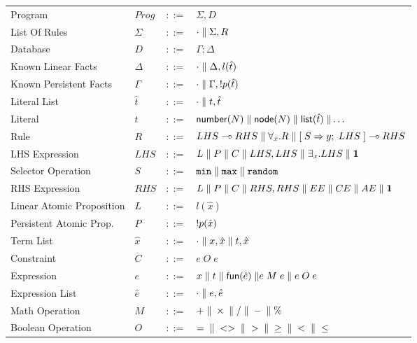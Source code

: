 \begin{table}[h]
\centering
\begin{tabular}{ l l c l }
  Program & $Prog$ & $::=$ & $\Sigma, D$ \\
  List Of Rules & $\Sigma$ & $::=$ & $\cdot \; \Vert \; \Sigma, R$\\
  Database & $D$ & $::=$ & $\Gamma; \Delta$ \\
  Known Linear Facts & $\Delta$ & $::=$ & $\cdot \; \Vert \; \Delta, l(\hat{t})$ \\
  Known Persistent Facts & $\Gamma$ & $::=$ & $\cdot \; \Vert \; \Gamma, {!} p(\hat{t})$ \\

  Literal List & $\hat{t}$ & $::=$ & $\cdot \; \Vert \; t, \hat{t}$ \\
  Literal & $t$ & $::=$ & $\mathsf{number}(N) \; \Vert \; \mathsf{node}(N) \; \Vert \; \mathsf{list}(\hat{t}) \; \Vert \ldots$ \\
  Rule & $R$ & $::=$ & $LHS \multimap RHS \; \Vert \; \forall_{x}. R \; \Vert \;
  [\; S \Rightarrow y; \; LHS \;] \multimap RHS$ \\
  LHS Expression & $LHS$ & $::=$ & $L \; \Vert \; P \; \Vert \; C \; \Vert \; LHS,
  LHS \; \Vert \; \exists_{x}. LHS \; \Vert \; \mathbf{1}$\\
  Selector Operation & $S$ & $::=$ & $\mathtt{min} \; \Vert \; \mathtt{max} \; \Vert \; \mathtt{random}$\\
  RHS Expression & $RHS$ & $::=$ & $L \; \Vert \; P \; \Vert \; C \; \Vert \; RHS, RHS \; \Vert
  \; EE \; \Vert \; CE \; \Vert \; AE \; \Vert \; \mathbf{1}$\\
  
  Linear Atomic Proposition & $L$ & $::=$ & $l(\hat{x})$\\
  Persistent Atomic Prop. & $P$ & $::=$ & ${!} p(\hat{x})$\\
  Term List & $\hat{x}$ & $::=$ & $\cdot \; \Vert \; x, \hat{x} \; \Vert \; t, \hat{x}$ \\
  Constraint & $C$ & $::=$ & $e \; O \; e$ \\
  Expression & $e$ & $::=$ & $x \; \Vert \; t \; \Vert \; \mathsf{fun}(\hat{e}) \; \Vert
  e \; M \; e \; \Vert \; e \; O \; e$ \\
  Expression List & $\hat{e}$ & $::=$ & $\cdot \; \Vert \; e, \hat{e}$ \\
  Math Operation & $M$ & $::=$ & $+ \; \Vert \; \times \; \Vert \; / \; \Vert \; - \; \Vert \; \%$ \\
  Boolean Operation & $O$ & $::=$ & $= \; \Vert \; <> \; \Vert \; > \; \Vert \;
  \geq \; \Vert \; < \; \Vert \; \leq $ \\


\end{tabular}
\end{table}
